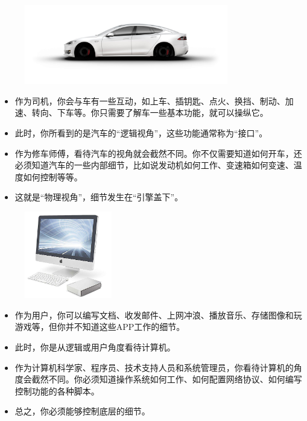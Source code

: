 \begin{frame}\ft{\secname}
  \begin{figure}
  	\centering
  	\includegraphics[width=3.5in]{images/car.jpg}
  \end{figure} \pause 
  \begin{itemize}
  \item   作为司机，你会与车有一些互动，如上车、插钥匙、点火、换挡、制动、加速、转向、下车等。你只需要了解车一些基本功能，就可以操纵它。\\
  \item[] 此时，你所看到的是汽车的“逻辑视角”，这些功能通常称为“接口”。 \\[0.1in] \pause 
  
  \item   作为修车师傅，看待汽车的视角就会截然不同。你不仅需要知道如何开车，还必须知道汽车的一些内部细节，比如说发动机如何工作、变速箱如何变速、温度如何控制等等。
  \item[] 这就是“物理视角”，细节发生在“引擎盖下”。
    
  \end{itemize}
\end{frame}

\begin{frame}\ft{\secname}
  \begin{figure}
  	\centering
  	\includegraphics[width=1.5in]{images/computer.jpeg}
  \end{figure} \pause 
  \begin{itemize}
  \item 作为用户，你可以编写文档、收发邮件、上网冲浪、播放音乐、存储图像和玩游戏等，但你并不知道这些APP工作的细节。
  \item[] 此时，你是从逻辑或用户角度看待计算机。 \\[0.1in] \pause 
  \item 作为计算机科学家、程序员、技术支持人员和系统管理员，你看待计算机的角度会截然不同。你必须知道操作系统如何工作、如何配置网络协议、如何编写控制功能的各种脚本。
  \item[] 总之，你必须能够控制底层的细节。

  \end{itemize}

\end{frame}

